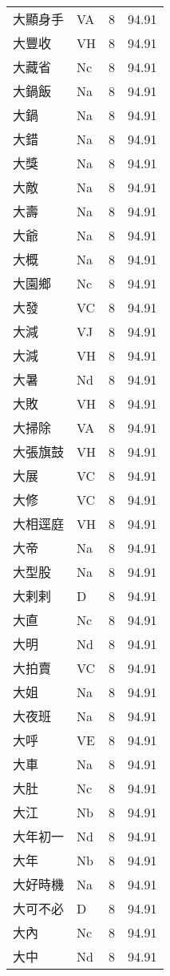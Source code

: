 \documentclass[twocolumn]{book}
\begin{document}
\begin{supertabular}{llrr}
大顯身手 & VA & 8 &  94.91\\
大豐收 & VH & 8 &  94.91\\
大藏省 & Nc & 8 &  94.91\\
大鍋飯 & Na & 8 &  94.91\\
大鍋 & Na & 8 &  94.91\\
大錯 & Na & 8 &  94.91\\
大獎 & Na & 8 &  94.91\\
大敵 & Na & 8 &  94.91\\
大壽 & Na & 8 &  94.91\\
大爺 & Na & 8 &  94.91\\
大概 & Na & 8 &  94.91\\
大園鄉 & Nc & 8 &  94.91\\
大發 & VC & 8 &  94.91\\
大減 & VJ & 8 &  94.91\\
大減 & VH & 8 &  94.91\\
大暑 & Nd & 8 &  94.91\\
大敗 & VH & 8 &  94.91\\
大掃除 & VA & 8 &  94.91\\
大張旗鼓 & VH & 8 &  94.91\\
大展 & VC & 8 &  94.91\\
大修 & VC & 8 &  94.91\\
大相逕庭 & VH & 8 &  94.91\\
大帝 & Na & 8 &  94.91\\
大型股 & Na & 8 &  94.91\\
大剌剌 & D & 8 &  94.91\\
大直 & Nc & 8 &  94.91\\
大明 & Nd & 8 &  94.91\\
大拍賣 & VC & 8 &  94.91\\
大姐 & Na & 8 &  94.91\\
大夜班 & Na & 8 &  94.91\\
大呼 & VE & 8 &  94.91\\
大車 & Na & 8 &  94.91\\
大肚 & Nc & 8 &  94.91\\
大江 & Nb & 8 &  94.91\\
大年初一 & Nd & 8 &  94.91\\
大年 & Nb & 8 &  94.91\\
大好時機 & Na & 8 &  94.91\\
大可不必 & D & 8 &  94.91\\
大內 & Nc & 8 &  94.91\\
大中 & Nd & 8 &  94.91\\

\end{supertabular}
\end{document}

